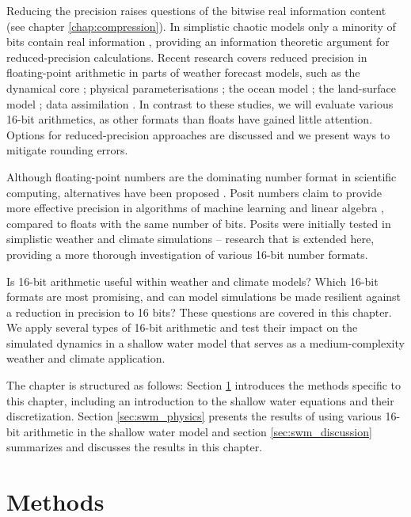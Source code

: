 Reducing the precision raises questions of the bitwise real information content (see chapter \ref{chap:compression}). In simplistic chaotic
models only a minority of bits contain real information \citep{Jeffress2017}, providing an information theoretic argument for reduced-precision
calculations. Recent research covers reduced precision in floating-point arithmetic in parts of weather forecast models,
such as the dynamical core \citep{Duben2014,Thornes2017,Chantry2019,Hatfield2020}; physical parameterisations \citep{Saffin2020};
the ocean model \citep{TintoPrims2019}; the land-surface model \citep{Dawson2018}; data assimilation \citep{Hatfield2017,Hatfield2018}.
In contrast to these studies, we will evaluate various 16-bit arithmetics, as other formats than floats have gained little attention.
Options for reduced-precision approaches are discussed and we present ways to mitigate rounding errors.

Although floating-point numbers are the dominating number format in scientific computing, alternatives have been proposed
\citep{Gustafson2017a}. Posit numbers claim to provide more effective precision in algorithms of machine learning
and linear algebra \citep{Gustafson2017a,Langroudi2019,Chen2018}, compared to floats with the same number of bits.
Posits were initially tested in simplistic weather and climate simulations \citep{Klower2019a} -- research that is extended
here, providing a more thorough investigation of various 16-bit number formats.

Is 16-bit arithmetic useful within weather and climate models? Which 16-bit formats are most promising, and can model
simulations be made resilient against a reduction in precision to 16 bits? These questions are covered in this chapter.
We apply several types of 16-bit arithmetic and test their impact on the simulated dynamics in a shallow water model that
serves as a medium-complexity weather and climate application.

The chapter is structured as follows: Section \ref{sec:swm_methods} introduces the methods specific to this chapter, including
an introduction to the shallow water equations and their discretization.  Section \ref{sec:swm_physics} presents the results of
using various 16-bit arithmetic in the shallow water model and  section \ref{sec:swm_discussion} summarizes and discusses
the results in this chapter.

\section{Methods}
\label{sec:swm_methods}

